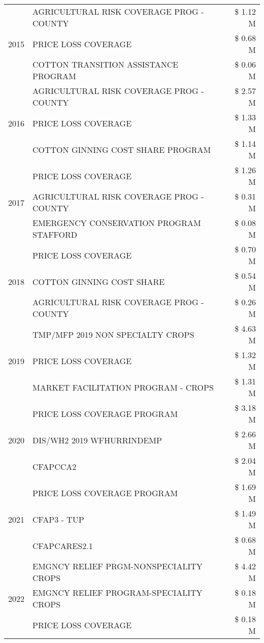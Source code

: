 \begin{tabular}{llr}
\cline{1-3}
\multirow[t]{3}{*}{2015} & AGRICULTURAL RISK COVERAGE PROG - COUNTY & \$ 1.12 M \\
 & PRICE LOSS COVERAGE & \$ 0.68 M \\
 & COTTON TRANSITION ASSISTANCE PROGRAM & \$ 0.06 M \\
\cline{1-3}
\multirow[t]{3}{*}{2016} & AGRICULTURAL RISK COVERAGE PROG - COUNTY & \$ 2.57 M \\
 & PRICE LOSS COVERAGE & \$ 1.33 M \\
 & COTTON GINNING COST SHARE PROGRAM & \$ 1.14 M \\
\cline{1-3}
\multirow[t]{3}{*}{2017} & PRICE LOSS COVERAGE & \$ 1.26 M \\
 & AGRICULTURAL RISK COVERAGE PROG - COUNTY & \$ 0.31 M \\
 & EMERGENCY CONSERVATION PROGRAM STAFFORD & \$ 0.08 M \\
\cline{1-3}
\multirow[t]{3}{*}{2018} & PRICE LOSS COVERAGE & \$ 0.70 M \\
 & COTTON GINNING COST SHARE & \$ 0.54 M \\
 & AGRICULTURAL RISK COVERAGE PROG - COUNTY & \$ 0.26 M \\
\cline{1-3}
\multirow[t]{3}{*}{2019} & TMP/MFP 2019 NON SPECIALTY CROPS & \$ 4.63 M \\
 & PRICE LOSS COVERAGE & \$ 1.32 M \\
 & MARKET FACILITATION PROGRAM - CROPS & \$ 1.31 M \\
\cline{1-3}
\multirow[t]{3}{*}{2020} & PRICE LOSS COVERAGE PROGRAM & \$ 3.18 M \\
 & DIS/WH2 2019 WFHURRINDEMP & \$ 2.66 M \\
 & CFAPCCA2 & \$ 2.04 M \\
\cline{1-3}
\multirow[t]{3}{*}{2021} & PRICE LOSS COVERAGE PROGRAM & \$ 1.69 M \\
 & CFAP3 - TUP & \$ 1.49 M \\
 & CFAPCARES2.1 & \$ 0.68 M \\
\cline{1-3}
\multirow[t]{3}{*}{2022} & EMGNCY RELIEF PRGM-NONSPECIALITY CROPS & \$ 4.42 M \\
 & EMGNCY RELIEF PROGRAM-SPECIALITY CROPS & \$ 0.18 M \\
 & PRICE LOSS COVERAGE & \$ 0.18 M \\
\cline{1-3}
\bottomrule
\end{tabular}
